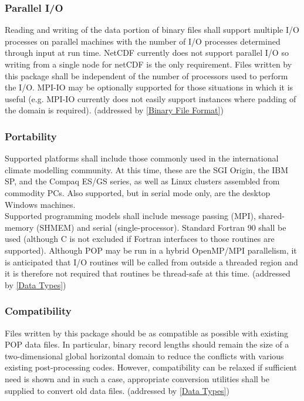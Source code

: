 \documentclass[11pt]{article}
\begin{document}
\subsubsection{Parallel I/O}
\label{Parallel I/O}
Reading and writing of the data portion of binary files 
shall support multiple I/O processes on parallel machines 
with the number of I/O processes determined through input at run time.  
NetCDF currently does not support parallel I/O so writing 
from a single node for netCDF is the only requirement.  
Files written by this package shall be independent of the 
number of processors used to perform the I/O.  
MPI-IO may be optionally supported for those situations 
in which it is useful (e.g. MPI-IO currently does not easily 
support instances where padding of the domain is required).
(addressed by \ref{Binary File Format})

\subsubsection{Portability}
\label{Portability}
Supported platforms shall include those commonly used in 
the international climate modelling community.  
At this time, these are the SGI Origin, the IBM SP, 
and the Compaq ES/GS series, as well as Linux clusters 
assembled from commodity PCs.  
Also supported, but in serial mode only, are the desktop Windows machines.
\\ 
Supported programming models shall include message passing (MPI), 
shared-memory (SHMEM) and serial (single-processor).  
Standard Fortran 90 shall be used (although C is not excluded 
if Fortran interfaces to those routines are supported).  
Although POP may be run in a hybrid OpenMP/MPI parallelism, 
it is anticipated that I/O routines will be called from 
outside a threaded region and it is therefore not required 
that routines be thread-safe at this time.
(addressed by \ref{Data Types})

\subsubsection{Compatibility}
\label{Compatibility}
Files written by this package should be as compatible as 
possible with existing POP data files.  
In particular, binary record lengths should remain the size 
of a two-dimensional global horizontal domain to reduce the 
conflicts with various existing post-processing codes.  
However, compatibility can be relaxed if sufficient need is 
shown and in such a case, appropriate conversion utilities 
shall be supplied to convert old data files.
(addressed by \ref{Data Types})
\end{document}
